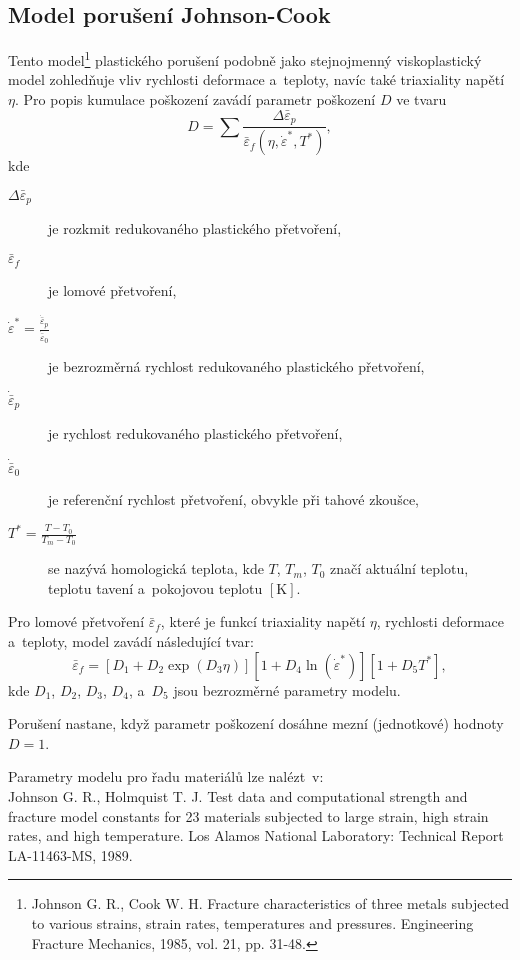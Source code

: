 
\subsection{Model porušení Johnson-Cook}\label{sec:johnson-cook-poruseni}
Tento model\footnote{Johnson G. R., Cook W. H. Fracture characteristics of three metals subjected to various strains, strain rates, temperatures and pressures. Engineering Fracture Mechanics, 1985, vol. 21, pp. 31-48.} plastického porušení podobně jako stejnojmenný viskoplastický model zohledňuje vliv rychlosti deformace a~teploty, navíc také triaxiality napětí $\eta$. Pro popis kumulace poškození zavádí parametr poškození $D$ ve tvaru
\begin{equation}\label{parametr-poskozeni}
	D = \sum \frac{\Delta \bar{\varepsilon}_p}{\bar{\varepsilon}_f(\eta, \dot{\varepsilon}^*, T^*)},
\end{equation}
kde
\begin{description}
	\item[$\Delta \bar{\varepsilon}_p$] je rozkmit redukovaného plastického přetvoření,
	\item[$\bar{\varepsilon}_f$] je lomové přetvoření,
	\item[$\dot{\varepsilon}^* = \tfrac{\dot{\bar{\varepsilon}}_p}{\dot{\bar{\varepsilon}}_0}$] je bezrozměrná rychlost redukovaného plastického přetvoření,
	\item[$\dot{\bar{\varepsilon}}_p$] je rychlost redukovaného plastického přetvoření,
	\item[$\dot{\bar{\varepsilon}}_0$] je referenční rychlost přetvoření, obvykle při tahové zkoušce,
	\item[$T^* = \tfrac{T-T_0}{T_m-T_0}$] se nazývá homologická teplota, kde $T$, $T_m$, $T_0$ značí aktuální teplotu, teplotu tavení a~pokojovou teplotu $[\si{\kelvin}]$.
\end{description}

Pro lomové přetvoření $\bar{\varepsilon}_f$, které je funkcí triaxiality napětí $\eta$, rychlosti deformace a~teploty, model zavádí následující tvar:
\begin{equation}
	\bar{\varepsilon}_f = \left[ D_1 + D_2 \exp(D_3 \eta) \right] \left[ 1 + D_4 \ln(\dot{\varepsilon}^*) \right] \left[ 1 + D_5 T^* \right],
\end{equation}
kde $D_1$, $D_2$, $D_3$, $D_4$, a~$D_5$ jsou bezrozměrné parametry modelu.

Porušení nastane, když parametr poškození dosáhne mezní (jednotkové) hodnoty $D=1$.

Parametry modelu pro řadu materiálů lze nalézt~v:\\ 
Johnson G. R., Holmquist T. J. Test data and computational strength and fracture model constants for 23 materials subjected to large strain, high strain rates, and high temperature. Los Alamos National Laboratory: Technical Report LA-11463-MS, 1989.
